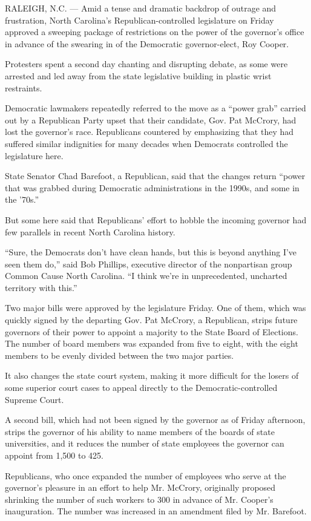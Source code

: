 RALEIGH, N.C. --- Amid a tense and dramatic backdrop of outrage and
frustration, North Carolina's Republican-controlled legislature on
Friday approved a sweeping package of restrictions on the power of the
governor's office in advance of the swearing in of the Democratic
governor-elect, Roy Cooper.

Protesters spent a second day chanting and disrupting debate, as some
were arrested and led away from the state legislative building in
plastic wrist restraints.

Democratic lawmakers repeatedly referred to the move as a ``power grab''
carried out by a Republican Party upset that their candidate, Gov. Pat
McCrory, had lost the governor's race. Republicans countered by
emphasizing that they had suffered similar indignities for many decades
when Democrats controlled the legislature here.

State Senator Chad Barefoot, a Republican, said that the changes return
``power that was grabbed during Democratic administrations in the 1990s,
and some in the '70s.''

But some here said that Republicans' effort to hobble the incoming
governor had few parallels in recent North Carolina history.

``Sure, the Democrats don't have clean hands, but this is beyond
anything I've seen them do,'' said Bob Phillips, executive director of
the nonpartisan group Common Cause North Carolina. ``I think we're in
unprecedented, uncharted territory with this.''

Two major bills were approved by the legislature Friday. One of them,
which was quickly signed by the departing Gov. Pat McCrory, a
Republican, strips future governors of their power to appoint a majority
to the State Board of Elections. The number of board members was
expanded from five to eight, with the eight members to be evenly divided
between the two major parties.

It also changes the state court system, making it more difficult for the
losers of some superior court cases to appeal directly to the
Democratic-controlled Supreme Court.

A second bill, which had not been signed by the governor as of Friday
afternoon, strips the governor of his ability to name members of the
boards of state universities, and it reduces the number of state
employees the governor can appoint from 1,500 to 425.

Republicans, who once expanded the number of employees who serve at the
governor's pleasure in an effort to help Mr. McCrory, originally
proposed shrinking the number of such workers to 300 in advance of Mr.
Cooper's inauguration. The number was increased in an amendment filed by
Mr. Barefoot.

